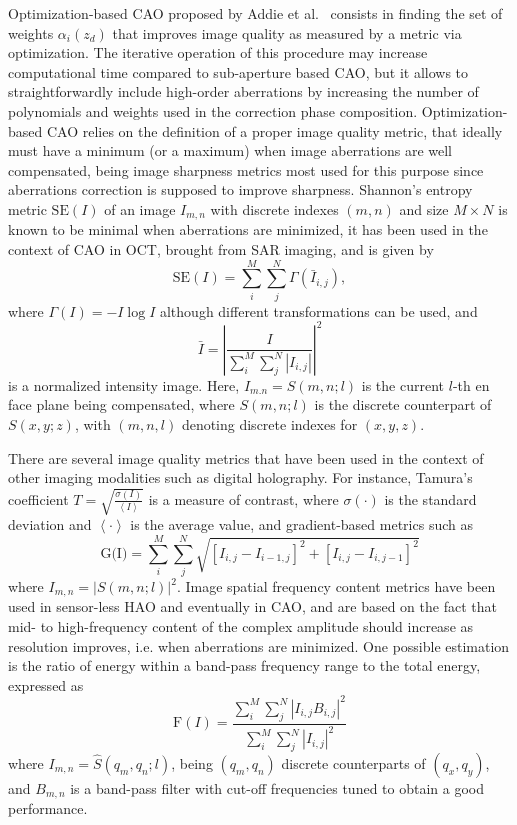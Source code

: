 Optimization-based CAO proposed by Addie et al.~\cite{} consists in finding the set of weights $\alpha_i(z_d)$ that improves image quality as measured by a metric via optimization. The iterative operation of this procedure may increase computational time compared to sub-aperture based CAO, but it allows to straightforwardly include high-order aberrations by increasing the number of polynomials and weights used in the correction phase composition. Optimization-based CAO relies on the definition of a proper image quality metric, that ideally must have a minimum (or a maximum) when image aberrations are well compensated, being image sharpness metrics most used for this purpose since aberrations correction is supposed to improve sharpness. Shannon's entropy metric $\text{SE}(I)$ of an image $I_{m,n}$ with discrete indexes $(m,n)$ and size $M\times N$ is known to be minimal when aberrations are minimized, it has been used in the context of CAO in OCT, brought from SAR imaging, and is given by
\begin{equation}
	\text{SE}(I) = \sum_i^M\sum_j^N \Gamma(\bar{I}_{i,j}),
\end{equation}
where $\Gamma(I) = -I\log I$ although different transformations can be used, and
\begin{equation}
	\bar{I} = \left|\frac{I}{\sum_i^M\sum_j^N \left|I_{i,j}\right|}\right|^2
\end{equation}
is a normalized intensity image. Here, $I_{m.n}=S(m,n; l)$ is the current $l$-th en face plane being compensated, where $S(m,n; l)$ is the discrete counterpart of $S(x,y;z)$, with $(m,n,l)$ denoting discrete indexes for $(x,y,z)$.

There are several image quality metrics that have been used in the context of other imaging modalities such as digital holography. For instance, Tamura's coefficient $T = \sqrt{\frac{\sigma(I)}{\left<I\right>}}$ is a measure of contrast, where $\sigma(\cdot)$ is the standard deviation and $\left<\cdot\right>$ is the average value, and gradient-based metrics such as
\begin{equation}
	\text{G(I)} = \sum_i^M\sum_j^N \sqrt{\left[I_{i,j}-I_{i-1,j}\right] ^2 + \left[I_{i,j}-I_{i,j-1}\right] ^2}
\end{equation}
where $I_{m,n} = |S(m,n; l)| ^ 2$. Image spatial frequency content metrics have been used in sensor-less HAO and eventually in CAO, and are based on the fact that mid- to high-frequency content of the complex amplitude should increase as resolution improves, i.e. when aberrations are minimized. One possible estimation is the ratio of energy within a band-pass frequency range to the total energy, expressed as
\begin{equation}
	\text{F}(I) = \frac{\sum_i^M\sum_j^N |I_{i,j}B_{i,j}|^2 }{\sum_i^M\sum_j^N |I_{i,j}|^2}
\end{equation}
where $I_{m,n} = \hat{S}(q_m, q_n; l)$, being $(q_m, q_n)$ discrete counterparts of $(q_x, q_y)$, and $B_{m,n}$ is a band-pass filter with cut-off frequencies tuned to obtain a good performance.

